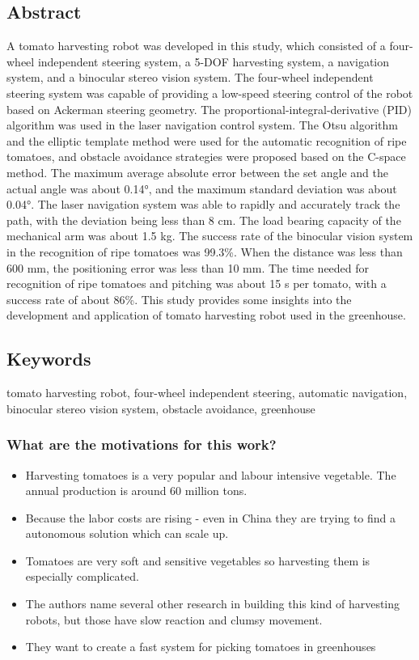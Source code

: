     \subsection*{Abstract}
    A tomato harvesting robot was developed in this study, which consisted of a four-wheel independent steering system,
    a 5-DOF harvesting system, a navigation system, and a binocular stereo vision system.
    The four-wheel independent steering system was capable of providing a low-speed steering control of the robot based on Ackerman steering geometry.
    The proportional-integral-derivative (PID) algorithm was used in the laser navigation control system. The Otsu algorithm and the
    elliptic template method were used for the automatic recognition of ripe tomatoes, and obstacle avoidance strategies were
    proposed based on the C-space method. The maximum average absolute error between the set angle and the actual angle was
    about 0.14°, and the maximum standard deviation was about 0.04°.  The laser navigation system was able to rapidly and
    accurately track the path, with the deviation being less than 8 cm.  The load bearing capacity of the mechanical arm was about
    1.5 kg. The success rate of the binocular vision system in the recognition of ripe tomatoes was 99.3\%.
    When the distance was less than 600 mm, the positioning error was less than 10 mm.
    The time needed for recognition of ripe tomatoes and pitching was about 15 s per tomato, with a success rate of about 86\%. 
    This study provides some insights into the development and application of tomato harvesting robot used in the greenhouse.
    
    
    \subsection*{Keywords}
    tomato harvesting robot, four-wheel independent steering, automatic navigation, binocular stereo vision system,
    obstacle avoidance, greenhouse
    
     
    
    \subsubsection*{What are the motivations for this work?}
    \begin{itemize}
        \item Harvesting tomatoes is a very popular and labour intensive vegetable. The annual production is around 60 million tons. 
        \item Because the labor costs are rising - even in China they are trying to find a autonomous solution which can scale up.
        \item Tomatoes are very soft and sensitive vegetables so harvesting them is especially complicated.
        \item The authors name several other research in building this kind of harvesting robots, but those have slow reaction and clumsy movement. 
        \item They want to create a fast system for picking tomatoes in greenhouses
    \end{itemize}
